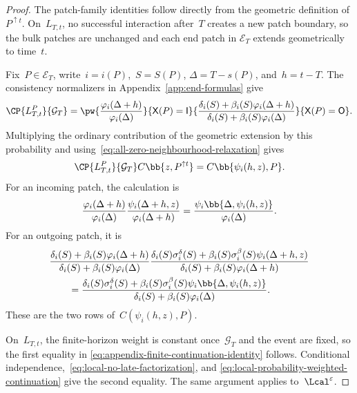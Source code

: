 \begin{proof}
The patch-family identities follow directly from the geometric definition of
$P^{\uparrow t}$. On~$L_{T,t}$, no successful interaction after~$T$ creates a
new patch boundary, so the bulk patches are unchanged and each end patch in
$\mathcal E_T$ extends geometrically to time~$t$.

Fix~$P\in\mathcal E_T$, write~$i=i(P)$,~$S=S(P)$,
$\Delta=T-s(P)$, and~$h=t-T$. The consistency normalizers in
Appendix~\ref{app:end-formulas} give
\begin{equation}
\label{eq:local-continuation-probability}
\CP{L_{T,t}^P}{\mathcal G_T}
=
\pw{
\displaystyle
\frac{\varphi_i(\Delta+h)}{\varphi_i(\Delta)}
}{\mathsf X(P)=\mathsf I}
{
\displaystyle
\frac{
\delta_i(S)+\beta_i(S)\varphi_i(\Delta+h)
}{
\delta_i(S)+\beta_i(S)\varphi_i(\Delta)
}
}{\mathsf X(P)=\mathsf O}.
\end{equation}
Multiplying the ordinary contribution of the geometric extension by this
probability and using~\eqref{eq:all-zero-neighbourhood-relaxation} gives
\begin{equation}
\label{eq:local-probability-weighted-continuation}
\CP{L_{T,t}^P}{\mathcal G_T}
C\bb{z,P^{\uparrow t}}
=
C\bb{\psi_i(h,z),P}.
\end{equation}
For an incoming patch, the calculation is
\begin{equation*}
\frac{\varphi_i(\Delta+h)}{\varphi_i(\Delta)}
\frac{\psi_i(\Delta+h,z)}{\varphi_i(\Delta+h)}
=
\frac{\psi_i\bb{\Delta,\psi_i(h,z)}}{\varphi_i(\Delta)}.
\end{equation*}
For an outgoing patch, it is
\begin{align*}
&\frac{
\delta_i(S)+\beta_i(S)\varphi_i(\Delta+h)
}{
\delta_i(S)+\beta_i(S)\varphi_i(\Delta)
}
\frac{
\delta_i(S)\sigma_i^\delta(S)
+
\beta_i(S)\sigma_i^\beta(S)\psi_i(\Delta+h,z)
}{
\delta_i(S)+\beta_i(S)\varphi_i(\Delta+h)
}
\\
&\qquad=
\frac{
\delta_i(S)\sigma_i^\delta(S)
+
\beta_i(S)\sigma_i^\beta(S)
\psi_i\bb{\Delta,\psi_i(h,z)}
}{
\delta_i(S)+\beta_i(S)\varphi_i(\Delta)
}.
\end{align*}
These are the two rows of~$C(\psi_i(h,z),P)$.

On~$L_{T,t}$, the finite-horizon weight is constant once~$\mathcal G_T$ and
the event are fixed, so the first equality in
\eqref{eq:appendix-finite-continuation-identity} follows. Conditional
independence,~\eqref{eq:local-no-late-factorization}, and
\eqref{eq:local-probability-weighted-continuation} give the second equality.
The same argument applies to~$\Lcal^\varepsilon$.


\end{proof}

